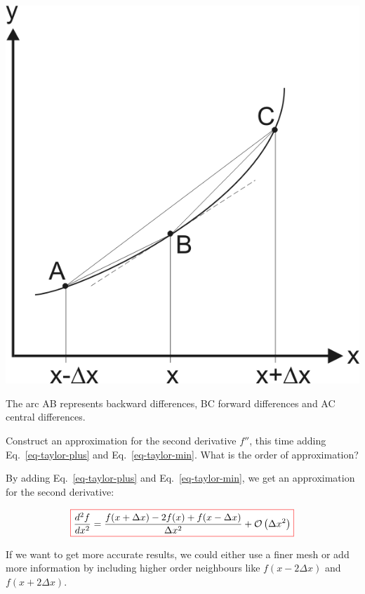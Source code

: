 \begin{marginfigure}
\centering
\includegraphics{numeric/figures/fd}
\caption{The arc AB represents backward differences, BC forward differences and AC central differences.}
\label{fig-fd}
\end{marginfigure}

\begin{cue}
Construct an approximation for the second derivative $f''$, this time adding Eq.~\ref{eq-taylor-plus} and Eq.~\ref{eq-taylor-min}. What is the order of approximation? 
\end{cue}

By adding Eq.~\ref{eq-taylor-plus} and Eq.~\ref{eq-taylor-min}, we get an approximation for the second derivative:

\begin{equation}
\fbox{$\displaystyle
\frac{d^2 f}{d x^2} = \frac{f(x + \Delta x) -2 f(x) + f(x- \Delta x)}{ \Delta x^2} + \mathcal{O}\left(\Delta x^2\right)
$}
\end{equation} 

If we want to get more accurate results, we could either use a finer mesh or add more information by including higher order neighbours like $f(x-2\Delta x)$ and $f(x+2\Delta x)$.

